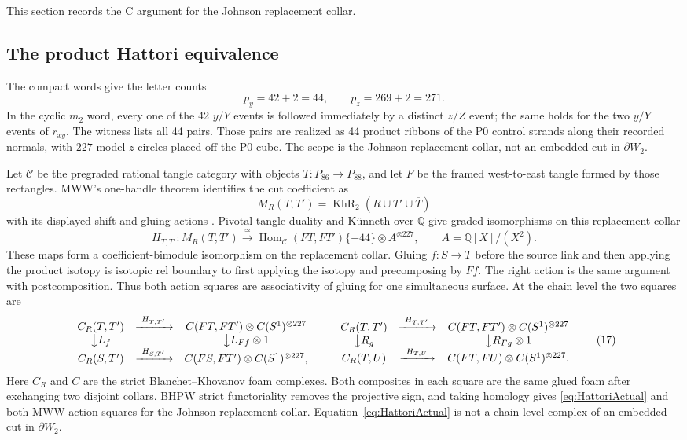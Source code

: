 \documentclass[11pt]{amsart}
\theoremstyle{definition}
\theoremstyle{remark}
\newcommand{\Q}{\mathbb{Q}}
\newcommand{\KhR}{\operatorname{KhR}}
\begin{document}
This section records the C argument for the Johnson replacement collar.

\subsection{The product Hattori equivalence}

The compact words give the letter counts
\[
p_y=42+2=44,\qquad p_z=269+2=271.
\]
In the cyclic $m_2$ word, every one of the 42
$y/Y$ events is followed immediately by a distinct $z/Z$ event; the same
holds for the two $y/Y$ events of $r_{xy}$.  The witness lists all 44 pairs.
Those pairs are realized as 44 product ribbons of the P0 control
strands along their recorded normals, with $227$ model $z$-circles placed
off the P0 cube.  The scope is the Johnson replacement collar, not an
embedded cut in $\partial W_2$.

Let $\mathcal C$ be the pregraded rational tangle category with objects
$T:P_{86}\to P_{88}$, and let $F$ be the framed west-to-east tangle formed
by those rectangles.  MWW's one-handle theorem identifies the cut coefficient
as
\[
M_R(T,T')=\KhR_2(R\cup T'\cup\overline T)
\]
with its displayed shift and gluing actions
\cite[Theorem~4.7]{ManolescuWalkerWedrich2023}.  Pivotal tangle duality and
K\"unneth over $\Q$ give graded isomorphisms on this replacement collar
\begin{equation}\label{eq:HattoriActual}
H_{T,T'}:M_R(T,T')\xrightarrow{\cong}
\operatorname{Hom}_{\mathcal C}(FT,FT')\{-44\}
\otimes A^{\otimes227},
\qquad A=\Q[X]/(X^2).
\end{equation}
These maps form a coefficient-bimodule isomorphism on the replacement collar.
Gluing $f:S\to T$ before the source link and then applying the product
isotopy is isotopic rel boundary to first applying the isotopy and
precomposing by $Ff$.  The right action is the same argument with
postcomposition.  Thus both action squares are associativity of gluing for
one simultaneous surface.  At the chain level the two squares are
\[
\begin{array}{ccc}
C_R(T,T')&\xrightarrow{\ H_{T,T'}\ }&
C(FT,FT')\otimes C(S^1)^{\otimes227}\\
\big\downarrow {L_f}&&\big\downarrow {L_{Ff}\otimes1}\\
C_R(S,T')&\xrightarrow{\ H_{S,T'}\ }&
C(FS,FT')\otimes C(S^1)^{\otimes227},
\end{array}
\qquad
\begin{array}{ccc}
C_R(T,T')&\xrightarrow{\ H_{T,T'}\ }&
C(FT,FT')\otimes C(S^1)^{\otimes227}\\
\big\downarrow {R_g}&&\big\downarrow {R_{Fg}\otimes1}\\
C_R(T,U)&\xrightarrow{\ H_{T,U}\ }&
C(FT,FU)\otimes C(S^1)^{\otimes227}.
\end{array}
\tag{17}
\]
Here $C_R$ and $C$ are the strict Blanchet--Khovanov foam complexes.  Both
composites in each square are the same glued foam after exchanging two
disjoint collars.  BHPW strict functoriality removes the projective sign, and
taking homology gives \eqref{eq:HattoriActual} and both MWW action squares
for the Johnson replacement collar.  Equation~\eqref{eq:HattoriActual} is
not a chain-level complex of an embedded cut in $\partial W_2$.
\end{document}
